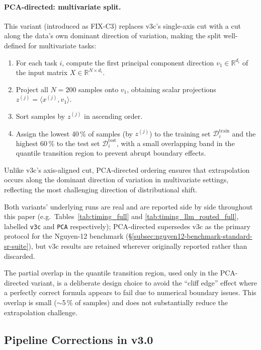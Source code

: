 \documentclass[twoside,11pt]{article}
\begin{document}
\paragraph{PCA-directed: multivariate split.}
This variant (introduced as FIX-C3) replaces v3c's single-axis cut with a
cut along the data's own dominant direction of variation, making the split
well-defined for multivariate tasks:
\begin{enumerate}[leftmargin=2em,label=\arabic*.]
  \item For each task $i$, compute the first principal component direction
    $v_1 \in \mathbb{R}^{d_i}$ of the input matrix $X \in \mathbb{R}^{N \times d_i}$.
  \item Project all $N=200$ samples onto $v_1$, obtaining scalar projections
    $z^{(j)} = \langle x^{(j)}, v_1 \rangle$.
  \item Sort samples by $z^{(j)}$ in ascending order.
  \item Assign the lowest 40\,\% of samples (by $z^{(j)}$) to the training set
    $\mathcal{D}^{\mathrm{train}}_i$ and the highest 60\,\% to the test set
    $\mathcal{D}^{\mathrm{test}}_i$, with a small overlapping band in the
    quantile transition region to prevent abrupt boundary effects.
\end{enumerate}
Unlike v3c's axis-aligned cut, PCA-directed ordering ensures that
extrapolation occurs along the dominant direction of variation in
multivariate settings, reflecting the most challenging direction of
distributional shift.

Both variants' underlying runs are real and are reported side by side
throughout this paper (e.g.\ Tables~\ref{tab:timing_full} and
\ref{tab:timing_llm_routed_full}, labelled \texttt{v3c} and \texttt{PCA}
respectively); PCA-directed supersedes v3c as the primary protocol for the
Nguyen-12 benchmark (\S\ref{subsec:nguyen12-benchmark-standard-sr-suite}),
but v3c results are retained wherever originally reported rather than
discarded.

\begin{remark}
The partial overlap in the quantile transition region, used only in the
PCA-directed variant, is a deliberate design choice to avoid the ``cliff
edge'' effect where a perfectly correct formula appears to fail due to
numerical boundary issues. This overlap is small ($\sim$5\,\% of samples)
and does not substantially reduce the extrapolation challenge.
\end{remark}

\subsection{Pipeline Corrections in v3.0}\label{subsec:pipeline-corrections-in-v30}
\label{sec:r2_bugfix}
\label{sec:corrections}
\end{document}
